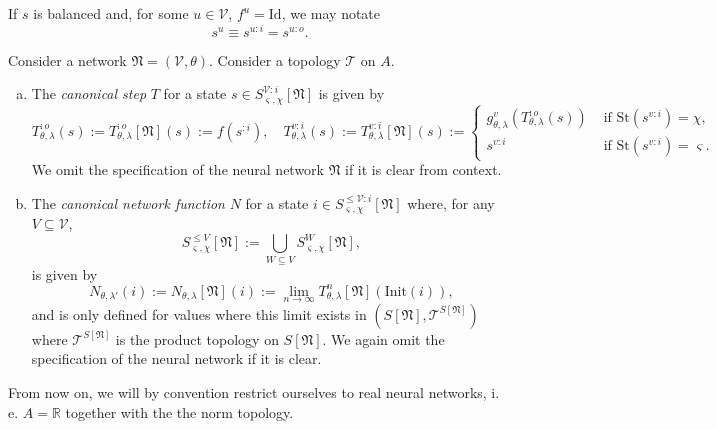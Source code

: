 \documentclass[a4paper,11pt]{report}
\newcommand{\const}{\varsigma} %
\newcommand{\var}{\chi} %
\newcommand{\In}{\text{Init}}
\newcommand{\St}{\text{St}}
\begin{document}
\begin{Not}
If $s$ is balanced and, for some $u\in\mathcal{V}$, $f^u=\text{Id}$, we may notate
\[
s^u\equiv s^{u:i}=s^{u:o}.
\]
\end{Not}

\begin{Def}\label{def:canonical-state-functions}
Consider a network $\mathfrak{N}=(\mathcal{V},\theta)$. Consider a topology $\mathcal{T}$ on $A$.
\begin{enumerate}[a)]
\item
The \emph{canonical step} $T$ for a state $s\in S^{\mathcal{V}:i}_{\const,\var}[\mathfrak{N}]$ is given by
\begin{equation}\label{eq:canonical-step}
T_{\theta,\lambda}^{:o}(s):=T_{\theta,\lambda}^{:o}[\mathfrak{N}](s):=f\left(s^{:i}\right),
\quad
T_{\theta,\lambda}^{v:i}(s):=T_{\theta,\lambda}^{v:i}[\mathfrak{N}](s):=
\begin{cases}
g^v_{\theta,\lambda}\left(T_{\theta,\lambda}^{:o}(s)\right)&\text{ if }\St(s^{v:i})=\var,\\
s^{v:i}&\text{ if }\St(s^{v:i})=\const.
\end{cases}
\end{equation}
We omit the specification of the neural network $\mathfrak{N}$ if it is clear from context.
\item
The \emph{canonical network function} $N$ for a state $i\in S^{\le\mathcal{V}:i}_{\const,\var}[\mathfrak{N}]$ where, for any $V\subseteq\mathcal{V}$, 
\[
S^{\le V}_{\const,\var}[\mathfrak{N}]:=\bigcup_{W\subseteq V}S^W_{\const,\var}[\mathfrak{N}],
\]
is given by
\begin{equation}
N_{\theta,\lambda'}(i):=N_{\theta,\lambda}[\mathfrak{N}](i):=\lim_{n\to\infty}T_{\theta,\lambda}^n[\mathfrak{N}](\In(i)),
\end{equation}
and is only defined for values where this limit exists in $(S[\mathfrak{N}],\mathcal{T}^{S[\mathfrak{N}]})$ where $\mathcal{T}^{S[\mathfrak{N}]}$ is the product topology on $S[\mathfrak{N}]$. We again omit the specification of the neural network if it is clear.
\end{enumerate}
\end{Def}

\begin{Par}
From now on, we will by convention restrict ourselves to real neural networks, i. e. $A=\mathbb{R}$ together with the the norm topology.
\end{Par}
\end{document}
